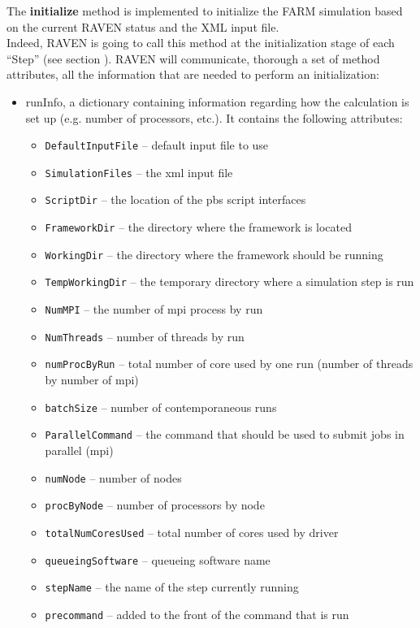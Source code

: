 The \textbf{initialize} method is implemented  to initialize the FARM simulation based on
the current RAVEN status and the XML input file.
%
 \\Indeed, RAVEN is going to call this method at the initialization stage of each ``Step'' (see section \cite{RAVENuserManual}).
%
RAVEN will communicate, thorough a set of method attributes, all the information
that are needed to perform an initialization:
\begin{itemize}
  \item runInfo, a dictionary containing information regarding how the
  calculation is set up (e.g. number of processors, etc.).
  It contains the following attributes:
  \begin{itemize}
    \item \texttt{DefaultInputFile} -- default input file to use
    \item \texttt{SimulationFiles} -- the xml input file
    \item \texttt{ScriptDir} -- the location of the pbs script interfaces
    \item \texttt{FrameworkDir} -- the directory where the framework is located
    \item \texttt{WorkingDir} -- the directory where the framework should be
    running
    \item \texttt{TempWorkingDir} -- the temporary directory where a simulation
    step is run
    \item \texttt{NumMPI} -- the number of mpi process by run
    \item \texttt{NumThreads} -- number of threads by run
    \item \texttt{numProcByRun} -- total number of core used by one run (number
    of threads by number of mpi)
    \item \texttt{batchSize} -- number of contemporaneous runs
    \item \texttt{ParallelCommand} -- the command that should be used to submit
    jobs in parallel (mpi)
    \item \texttt{numNode} -- number of nodes
    \item \texttt{procByNode} -- number of processors by node
    \item \texttt{totalNumCoresUsed} -- total number of cores used by driver
    \item \texttt{queueingSoftware} -- queueing software name
    \item \texttt{stepName} -- the name of the step currently running
    \item \texttt{precommand} -- added to the front of the command that is run

\end{itemize}
\end{itemize}
